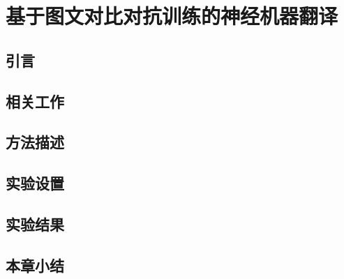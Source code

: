 \chapter{基于图文对比对抗训练的神经机器翻译}

\section{引言}

\section{相关工作}

\section{方法描述}

\section{实验设置}

\section{实验结果}

\section{本章小结}
